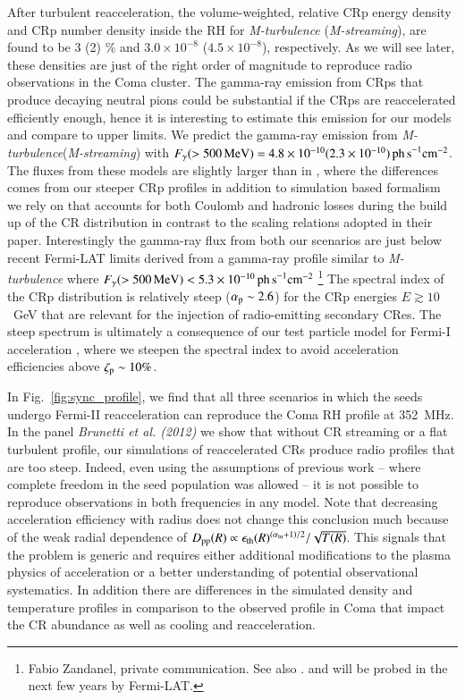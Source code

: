 \documentclass[useAMS,usenatbib]{mn2e}
\newcommand{\Mstream}{{\it M-streaming}\xspace}
\newcommand{\Mflatturb}{{\it M-turbulence}\xspace}
\begin{document}
After turbulent reacceleration, the volume-weighted, relative CRp
energy density and CRp number density inside the RH for \Mflatturb
(\Mstream), are found to be 3 (2) \% and $3.0\times10^{-8}$
($4.5\times10^{-8}$), respectively. As we will see later, these
densities are just of the right order of magnitude to reproduce radio
observations in the Coma cluster. The gamma-ray emission from CRps
that produce decaying neutral pions could be substantial if the CRps
are reaccelerated efficiently enough, hence it is interesting to
estimate this emission for our models and compare to upper limits. We
predict the gamma-ray emission from \Mflatturb (\Mstream) with
$F_\gamma(>500\,{\mathrm{MeV}})=4.8\times10^{-10} (2.3\times10^{-10})
\mathrm{ \,ph\, s}^{-1}\mathrm{cm}^{-2}$. The fluxes from these
models are slightly larger than in \cite{brunetti12}, where the
differences comes from our steeper CRp profiles in addition to
simulation based formalism we rely on that accounts for both Coulomb
and hadronic losses during the build up of the CR distribution in
contrast to the scaling relations adopted in their
paper. Interestingly the gamma-ray flux from both our scenarios are
just below recent Fermi-LAT limits derived from a gamma-ray profile
similar to \Mflatturb where
$F_\gamma(>500\,{\mathrm{MeV}})<5.3\times10^{-10} \mathrm{ \,ph\,
  s}^{-1}\mathrm{cm}^{-2}$ \footnote{Fabio Zandanel, private
  communication. See also
  \citet{2014MNRAS.440..663Z,2014ApJ...787...18A}. and will be probed
  in the next few years by Fermi-LAT. } The spectral index of the CRp
distribution is relatively steep ($\alpha_{{\mathrm{p}}}\sim2.6$) for the
CRp energies $E \gtrsim 10$~GeV that are relevant for the injection of
radio-emitting secondary CRes. The steep spectrum is ultimately a
consequence of our test particle model for Fermi-I acceleration
\citep{pinzke13}, where we steepen the spectral index to avoid
acceleration efficiencies above $\zeta_{{\mathrm{p}}} \sim 10\%$.

In Fig.~\ref{fig:sync_profile}, we find that all three scenarios in
which the seeds undergo Fermi-II reacceleration can reproduce the Coma
RH profile at 352~MHz. In the panel {\it Brunetti et al. (2012)} we
show that without CR streaming or a flat turbulent profile, our
simulations of reaccelerated CRs produce radio profiles that are too
steep. Indeed, even using the assumptions of previous work -- where
complete freedom in the seed population was allowed -- it is not
possible to reproduce observations in both frequencies in any
model. Note that decreasing acceleration efficiency with radius does
not change this conclusion much because of the weak radial dependence
of $D_{\mathrm{pp}}(R)\propto
\epsilon_{\mathrm{th}}(R)^{(\alpha_{\mathrm{tu}}+1)/2}/\sqrt{T(R)}$. This
signals that the problem is generic and requires either additional
modifications to the plasma physics of acceleration or a better
understanding of potential observational systematics. In addition
there are differences in the simulated density and temperature
profiles in comparison to the observed profile in Coma that impact the
CR abundance as well as cooling and reacceleration.
\end{document}
